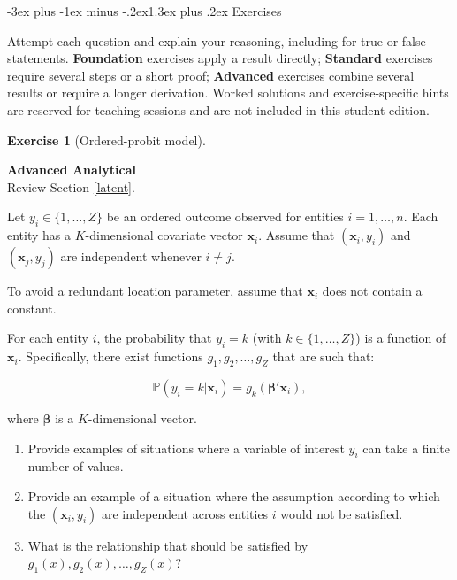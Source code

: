 \documentclass[
  11pt,
]{book}
\makeatletter
\renewcommand\section{\@startsection{section}{1}{\z@}
  {-3ex plus -1ex minus -.2ex}{1.3ex plus .2ex}
  {\normalfont\Large\bfseries\color{TextbookInk}}}
\theoremstyle{definition}
\theoremstyle{definition}
\theoremstyle{definition}
\newtheorem{exercise}{Exercise}[chapter]
\theoremstyle{definition}
\theoremstyle{remark}
\makeatother
\begin{document}
\clearpage

\section{Exercises}\label{binary-exercises}

Attempt each question and explain your reasoning, including for true-or-false statements. \textbf{Foundation} exercises apply a result directly; \textbf{Standard} exercises require several steps or a short proof; \textbf{Advanced} exercises combine several results or require a longer derivation. Worked solutions and exercise-specific hints are reserved for teaching sessions and are not included in this student edition.


\begin{exercisebox}

\begin{exercise}[Ordered-probit model]
\protect\hypertarget{exr:binary-multinomial-choice}{}\label{exr:binary-multinomial-choice}

\textbf{Advanced \textbar{} Analytical}\\
Review Section \ref{latent}.

Let \(y_i\in\{1,\dots,Z\}\) be an ordered outcome observed for entities \(i=1,\dots,n\). Each entity has a \(K\)-dimensional covariate vector \(\mathbf{x}_i\). Assume that \((\mathbf{x}_i,y_i)\) and \((\mathbf{x}_j,y_j)\) are independent whenever \(i\ne j\).

To avoid a redundant location parameter, assume that \(\mathbf{x}_i\) does not contain a constant.

For each entity \(i\), the probability that \(y_i = k\) (with \(k \in \{1, \dots, Z\}\)) is a function of \(\mathbf{x}_i\). Specifically, there exist functions \(g_1, g_2, \dots, g_Z\) that are such that:

\[\mathbb{P}(y_i = k | \mathbf{x}_i) = g_k(\boldsymbol{\beta}' \mathbf{x}_i),\]

where \(\boldsymbol{\beta}\) is a \(K\)-dimensional vector.

\begin{enumerate}
\def\labelenumi{\arabic{enumi}.}
\item
  Provide examples of situations where a variable of interest \(y_i\) can take a finite number of values.
\item
  Provide an example of a situation where the assumption according to which the \((\mathbf{x}_i, y_i)\) are independent across entities \(i\) would not be satisfied.
\item
  What is the relationship that should be satisfied by \(g_1(x), g_2(x), \dots, g_Z(x)\)?
\end{enumerate}


\end{exercise}
\end{exercisebox}
\end{document}
